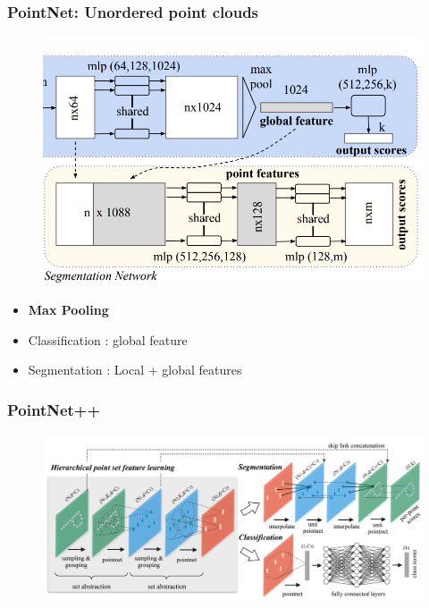 \documentclass{beamer}
\begin{document}
\begin{frame}[allowframebreaks]
\frametitle{PointNet: Unordered point clouds}
\begin{minipage}{\textwidth}
\begin{minipage}{0.45\textwidth}
        \begin{figure}
        \centering        \includegraphics[width=\textwidth,height=0.8\textheight,keepaspectratio]{img/05_Pointnet_end.png}
        
        \label{fig:enter-label}
    \end{figure}
    \end{minipage}
    \hfill
    \begin{minipage}{0.45\textwidth}
        \begin{itemize}
            \item \textbf{Max Pooling}
            \item Classification : global feature
            \item Segmentation : Local + global features
        \end{itemize}
    \end{minipage}
    
    
\end{minipage}
\end{frame}
\begin{frame}[t,allowframebreaks]
    \frametitle{PointNet++}
    \begin{figure}
        \centering
        \includegraphics[width=\textwidth,height=0.8\textheight,keepaspectratio]{img/05_Pointnet2.png}
        \label{fig:enter-label}
    \end{figure}
\end{frame}
\end{document}
